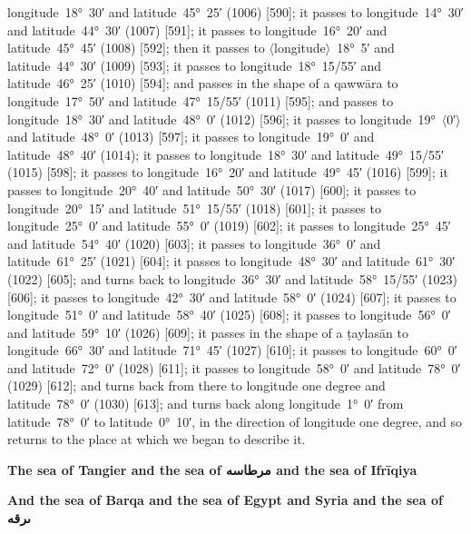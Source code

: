 \documentclass[11pt]{article}
\newcommand{\Pg}[1]{\marginpar{\footnotesize #1}}
\newcommand{\Ang}[1]{\ensuremath{#1}}
\begin{document}
longitude~18°~30′ and latitude~45°~25′ (1006) [590]; it passes to longitude~14°~30′ and latitude~44°~30′ (1007) [591]; it passes to longitude~16°~20′ and latitude~45°~45′ (1008) [592]; then it passes to \Ang{\langle}longitude\Ang{\rangle}~18°~5′ and latitude~44°~30′ (1009) [593]; it passes to longitude~18°~15/55′ and latitude~46°~25′ (1010) [594]; and passes in the shape of a qawwāra to longitude~17°~50′ and latitude~47°~15/55′ (1011) [595]; and passes to longitude~18°~30′ and latitude~48°~0′ (1012) [596]; it passes to longitude~19°~\Ang{\langle}0′\Ang{\rangle} and latitude~48°~0′ (1013) [597]; it passes to longitude~19°~0′ and latitude~48°~40′ (1014); it passes to longitude~18°~30′ and latitude~49°~15/55′ (1015) [598]; it passes to longitude~16°~20′ and latitude~49°~45′ (1016) [599]; it passes to longitude~20°~40′ and latitude~50°~30′ (1017) [600]; it passes to longitude~20°~15′ and latitude~51°~15/55′ (1018) [601]; it passes to longitude~25°~0′ and latitude~55°~0′ (1019) [602]; it passes to longitude~25°~45′ and latitude~54°~40′ (1020) [603]; it passes to longitude~36°~0′ and latitude~61°~25′ (1021) [604]; it passes to longitude~48°~30′ and latitude~61°~30′ (1022) [605]; and turns back to longitude~36°~30′ and latitude~58°~15/55′ (1023) [606]; it passes to longitude~42°~30′ and latitude~58°~0′ (1024) [607]; it passes to longitude~51°~0′ and latitude~58°~40′ (1025) [608]; it passes to longitude~56°~0′ and latitude~59°~10′ (1026) [609]; it passes in the shape of a ṭaylasān to longitude~66°~30′ and latitude~71°~45′ (1027) [610]\Pg{p. 69}; it passes to longitude~60°~0′ and latitude~72°~0′ (1028) [611]; it passes to longitude~58°~0′ and latitude~78°~0′ (1029) [612]; and turns back from there to longitude one degree and latitude~78°~0′ (1030) [613]; and turns back along longitude~1°~0′ from latitude~78°~0′ to latitude~0°~10′, in the direction of longitude one degree, and so returns to the place at which we began to describe it.

\par\medskip\begin{center}\bfseries The sea of Tangier and the sea of \textarabic{مرطاسه} and the sea of Ifrīqiya\end{center}\par

\par\medskip\begin{center}\bfseries And the sea of Barqa and the sea of Egypt and Syria and the sea of \textarabic{ٮرقه}\end{center}\par
\end{document}
